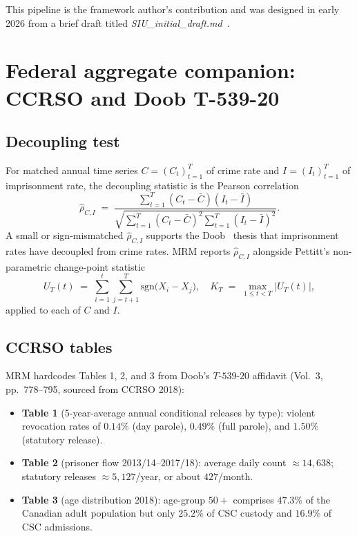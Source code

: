 \documentclass[11pt,a4paper]{article}
\theoremstyle{plain}
\theoremstyle{definition}
\theoremstyle{remark}
\begin{document}
This pipeline is the framework author's contribution and was
designed in early 2026 from a brief draft titled
\emph{SIU\_initial\_draft.md}~\cite{Ruhela2026SIUDraft}.

\section{Federal aggregate companion: CCRSO and Doob T-539-20}
\label{sec:ccrso}

\subsection{Decoupling test}

For matched annual time series $C = (C_{t})_{t=1}^{T}$ of
crime rate and $I = (I_{t})_{t=1}^{T}$ of imprisonment rate, the
decoupling statistic is the Pearson correlation
\begin{equation}
  \widehat{\rho}_{C, I} \;=\;
  \frac{\sum_{t=1}^{T}
        (C_{t} - \bar{C})(I_{t} - \bar{I})}
       {\sqrt{\sum_{t=1}^{T}(C_{t}-\bar{C})^{2}
              \sum_{t=1}^{T}(I_{t}-\bar{I})^{2}}}.
  \label{eq:decoupling}
\end{equation}
A small or sign-mismatched $\widehat{\rho}_{C,I}$ supports the
Doob~\cite{Doob2020Affidavit} thesis that imprisonment rates
have decoupled from crime rates. MRM reports
$\widehat{\rho}_{C,I}$ alongside Pettitt's
non-parametric change-point statistic
\begin{equation}
  U_{T}(t) \;=\; \sum_{i=1}^{t} \sum_{j=t+1}^{T}
   \mathrm{sgn}\bigl(X_{i} - X_{j}\bigr),
  \quad
  K_{T} \;=\; \max_{1 \le t < T} \lvert U_{T}(t) \rvert,
  \label{eq:pettitt}
\end{equation}
applied to each of $C$ and $I$.

\subsection{CCRSO tables}

MRM hardcodes Tables 1, 2, and 3 from Doob's $T$-$539$-$20$
affidavit (Vol.\ 3, pp.\ 778--795, sourced from CCRSO 2018):
\begin{itemize}
  \item \textbf{Table 1} (5-year-average annual conditional
        releases by type): violent revocation rates of
        $0.14\%$ (day parole), $0.49\%$ (full parole), and
        $1.50\%$ (statutory release).
  \item \textbf{Table 2} (prisoner flow 2013/14--2017/18):
        average daily count $\approx 14{,}638$; statutory
        releases $\approx 5{,}127$/year, or about $427$/month.
  \item \textbf{Table 3} (age distribution 2018): age-group
        $50+$ comprises $47.3\%$ of the Canadian adult population
        but only $25.2\%$ of CSC custody and $16.9\%$ of CSC
        admissions.
\end{itemize}
\end{document}
